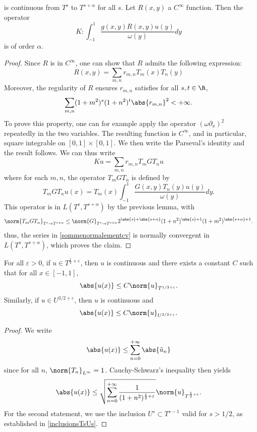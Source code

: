 \documentclass[a4paper]{article}
\begin{document}
\begin{Prop}
\begin{Lem}
			is continuous from $T^s$ to $T^{s + \alpha}$ for all $s$. Let $R(x,y)$ a $C^{\infty}$ function. Then the operator 
			\[K : \int_{-1}^{1} \frac{g(x,y) R(x,y) u(y)}{\omega(y)}dy\]
			is of order $\alpha$. 
		\end{Lem}
		\begin{proof}
			Since $R$ is in $C^{\infty}$, one can show that $R$ admits the following expression:
			\begin{equation}
			R(x,y) = \sum_{m,n} r_{m,n} T_m(x) T_n(y)
			\label{sommenormalementcv}
			\end{equation}
			Moreover, the regularity of $R$ ensures $r_{m,n}$ satisfies for all $s,t \in \R$, 
			\[\sum_{m,n} (1 + m^2)^s (1 + n^2)^t\abs{r_{m,n}}^2 < +\infty.\] 
			To prove this property, one can for example apply the operator $(\omega \partial_x)^2$ repeatedly in the two variables. The resulting function is $C^\infty$, and in particular, square integrable on $[0,1] \times [0,1]$. We then write the Parseval's identity and the result follows. We can thus write 
			\[Ku = \sum_{m,n} r_{m,n} T_m G T_n u  \]
			where for each $m,n$, the operator $T_m G T_n$ is defined by 
			\[ T_m G T_n u (x)= T_m(x) \int_{-1}^{1} \dfrac{G(x,y) T_n(y)u(y)}{\omega(y)}dy.\]
			This operator is in $L(T^s,T^{s+\alpha})$ by the previous lemma, with 	
			\[\norm{T_m G T_n}_{T^s \to T^{s+\alpha}} \leq \norm{G}_{T^s \to T^{s + \alpha}} 2^{\abs{s} + \abs{s + \alpha}}(1 + n^2)^{\abs{s}+1}(1 + m^2)^{\abs{s+ \alpha} + 1}.\]
			thus, the series in \eqref{sommenormalementcv} is normally convergent in $L(T^s, T^{s + \alpha})$, which proves the claim. 
		\end{proof}
	\end{Prop}
	\begin{Lem}
		\label{LemInjectionsContinues}
		For all $\varepsilon >0$, if $u \in T^{\frac{1}{2} + \varepsilon}$, then $u$ is continuous and there exists a constant $C$ such that for all $x \in [-1,1]$,
		\[ \abs{u(x)} \leq C \norm{u}_{T^{1/2 + \varepsilon}}.\]	
		Similarly, if $u \in U^{3/2 + \varepsilon}$, then $u$ is continuous and 
		\[ \abs{u(x)} \leq C \norm{u}_{U^{3/2 + \varepsilon}}.\]
		\begin{proof}
			We write 
			\[\abs{u(x)} \leq \sum_{n = 0}^{+ \infty} \abs{\hat{u}_n}\]
			since for all $n$, $\norm{T_n}_{L^\infty} = 1$. Cauchy-Schwarz's inequality then yields
			\[\abs{u(x)} \leq \sqrt{\sum_{n= 0}^{+ \infty} \frac{1}{(1+ n^2)^{\frac{1}{2}+ \varepsilon}}} \norm{u}_{T^{\frac{1}{2} + \varepsilon}}.\]
			For the second statement, we use the inclusion $U^{s} \subset T^{s-1}$ valid for $s > 1/2$, as established in \autoref{inclusionsTsUs}. 
		\end{proof}	
	\end{Lem}
\end{document}
